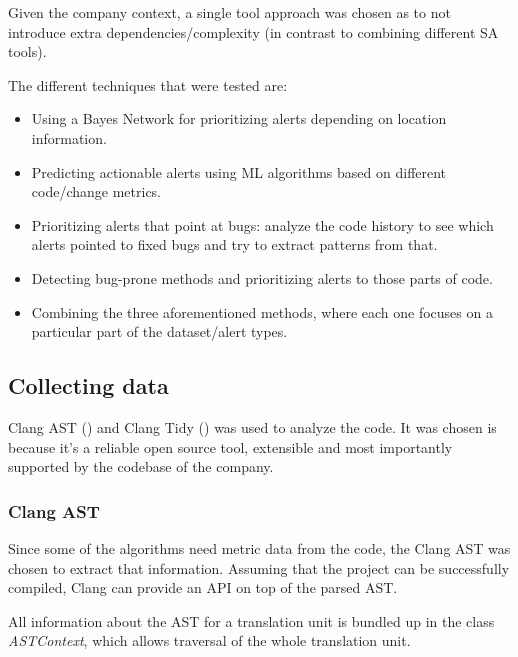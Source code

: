 \documentclass{article}
\begin{document}
Given the company context, a single tool approach was chosen as to not introduce extra dependencies/complexity (in contrast to combining different SA tools). 

The different techniques that were tested are:
\begin{itemize}
    \item Using a Bayes Network for prioritizing alerts depending on location information.
    \item Predicting actionable alerts using ML algorithms based on different code/change metrics.
    \item Prioritizing alerts that point at bugs: analyze the code history to see which alerts pointed to fixed bugs and try to extract patterns from that.
    \item Detecting bug-prone methods and prioritizing alerts to those parts of code.
    \item Combining the three aforementioned methods, where each one focuses on a particular part of the dataset/alert types.
\end{itemize}


\subsection{Collecting data}

Clang AST (\cite{clang_ast}) and Clang Tidy (\cite{clang_tidy}) was used to analyze the code. It was chosen is because it's a reliable open source tool, extensible and most importantly supported by the codebase of the company.

\subsubsection{Clang AST}
Since some of the algorithms need metric data from the code, the Clang AST was chosen to extract that information. Assuming that the project can be successfully compiled, Clang can provide an API on top of the parsed AST.  

All information about the AST for a translation unit is bundled up in the class \textit{ASTContext}, which allows traversal of the whole translation unit.
\end{document}
